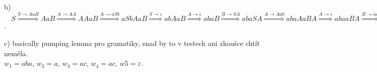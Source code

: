 b) 
$\quad S \stackrel{S \rightarrow A a B}{\Longrightarrow} A a B \stackrel{A \rightarrow A A}{\Longrightarrow} 
A A a B \stackrel{A \rightarrow a S b}{\Longrightarrow} a S b A a B \stackrel{S \rightarrow \varepsilon}
{\Longrightarrow} a b A a B \stackrel{A \rightarrow \varepsilon}{\Longrightarrow} a b a B \stackrel
{B \rightarrow SA}{\Longrightarrow} a b a S A \stackrel{A\rightarrow Aab}{\Longrightarrow} abaAaBA \stackrel
{A\rightarrow \varepsilon}{\Longrightarrow} a b a aBA \stackrel{B \rightarrow ac}{\Longrightarrow} abaaacA 
\stackrel{A \rightarrow SB}{\Longrightarrow} abaaacSB \stackrel{S \rightarrow \varepsilon}{\Longrightarrow} 
abaaacB \stackrel{B \rightarrow ac}{\Longrightarrow} abaaacac $.

\vspace*{1mm}
c) basically pumping lemma pro gramatiky, snad by to v testech ani zkoušce chtít neměla. \\
$w_1 = aba$, $w_2 = a$, $w_3 = ac$, $w_4 = ac$, $w5 = \varepsilon$. 

